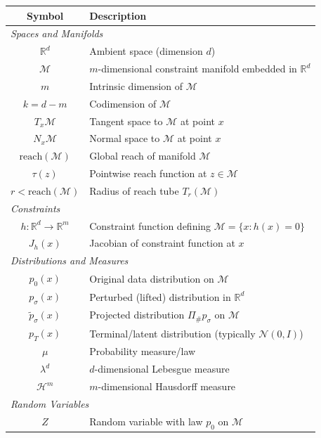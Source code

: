 \begin{table}[H]
\centering
\label{tab:notation}
\begin{tabular}{cl}
\toprule
\textbf{Symbol} & \textbf{Description} \\
\midrule
\multicolumn{2}{l}{\textit{Spaces and Manifolds}} \\
$\mathbb{R}^d$ & Ambient space (dimension $d$) \\
$\mathcal{M}$ & $m$-dimensional constraint manifold embedded in $\mathbb{R}^d$ \\
$m$ & Intrinsic dimension of $\mathcal{M}$ \\
$k = d - m$ & Codimension of $\mathcal{M}$ \\
$T_x\mathcal{M}$ & Tangent space to $\mathcal{M}$ at point $x$ \\
$N_x\mathcal{M}$ & Normal space to $\mathcal{M}$ at point $x$ \\
$\text{reach}(\mathcal{M})$ & Global reach of manifold $\mathcal{M}$ \\
$\tau(z)$ & Pointwise reach function at $z \in \mathcal{M}$ \\
$r < \text{reach}(\mathcal{M})$ & Radius of reach tube $T_r(\mathcal{M})$ \\
\midrule
\multicolumn{2}{l}{\textit{Constraints}} \\
$h: \mathbb{R}^d \to \mathbb{R}^m$ & Constraint function defining $\mathcal{M} = \{x : h(x) = 0\}$ \\
$J_h(x)$ & Jacobian of constraint function at $x$ \\
\midrule
\multicolumn{2}{l}{\textit{Distributions and Measures}} \\
$p_0(x)$ & Original data distribution on $\mathcal{M}$ \\
$p_\sigma(x)$ & Perturbed (lifted) distribution in $\mathbb{R}^d$ \\
$\tilde{p}_\sigma(x)$ & Projected distribution $\Pi_\# p_\sigma$ on $\mathcal{M}$ \\
$p_T(x)$ & Terminal/latent distribution (typically $\mathcal{N}(0, I)$) \\
$\mu$ & Probability measure/law \\
$\lambda^d$ & $d$-dimensional Lebesgue measure \\
$\mathcal{H}^m$ & $m$-dimensional Hausdorff measure \\
\midrule
\multicolumn{2}{l}{\textit{Random Variables}} \\
$Z$ & Random variable with law $p_0$ on $\mathcal{M}$ \\

\end{tabular}
\end{table}
